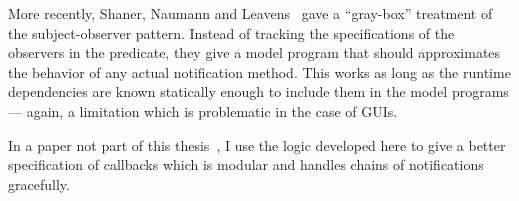 More recently, Shaner, Naumann and Leavens~\cite{ShanerLN07} gave a
``gray-box'' treatment of the subject-observer pattern.  Instead of
tracking the specifications of the observers in the predicate, they
give a model program that should approximates the behavior of any
actual notification method. This works as long as the runtime
dependencies are known statically enough to include them in the model
programs --- again, a limitation which is problematic in the case of
GUIs.

In a paper not part of this thesis~\cite{tldi10}, I use the logic
developed here to give a better specification of callbacks which is
modular and handles chains of notifications gracefully.




% 
% 
% 
% 
% 
